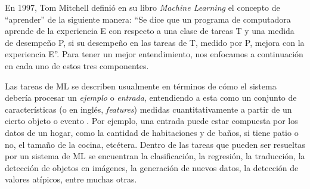 \documentclass[../../main.tex]{subfiles}
\begin{document}
En 1997, Tom Mitchell definió en su libro \textit{Machine Learning} \cite{ml-tom-mitchell} el concepto de ``aprender'' de la siguiente manera: ``Se dice que un programa de computadora aprende de la experiencia E con respecto a una clase de tareas T y una medida de desempeño P, si su desempeño en las tareas de T, medido por P, mejora con la experiencia E''. Para tener un mejor entendimiento, nos enfocamos a continuación en cada uno de estos tres componentes.

Las tareas de ML se describen usualmente en términos de cómo el sistema debería procesar un \textit{ejemplo} o \textit{entrada}, entendiendo a esta como un conjunto de características (o en inglés, \textit{features}) medidas cuantitativamente a partir de un cierto objeto o evento \cite{deep-learning}. Por ejemplo, una entrada puede estar compuesta por los datos de un hogar, como la cantidad de habitaciones y de baños, si tiene patio o no, el tamaño de la cocina, etcétera. Dentro de las tareas que pueden ser resueltas por un sistema de ML se encuentran la clasificación, la regresión, la traducción, la detección de objetos en imágenes, la generación de nuevos datos, la detección de valores atípicos, entre muchas otras.
\end{document}
